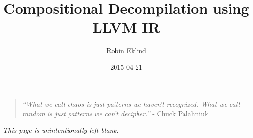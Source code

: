 \documentclass[12pt, a4paper]{article}
\title{Compositional Decompilation using LLVM IR}
\author{Robin Eklind}
\date{2015-04-21}
\begin{document}






\maketitle



\vfill

\begin{quote}
	\textit{``What we call chaos is just patterns we haven't recognized. What we call random is just patterns we can't decipher.''} - Chuck Palahniuk \cite{patterns_quote}
\end{quote}

\clearpage





\tableofcontents

\clearpage



\thispagestyle{empty}

\vspace*{2.5cm}

\begin{center}
	\textit{This page is unintentionally left blank.}
\end{center}

\clearpage













\end{document}

